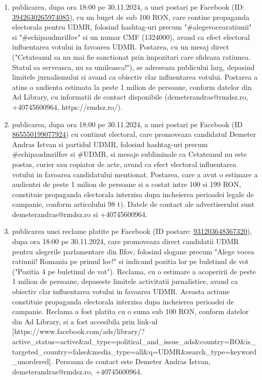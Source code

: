\documentclass[a4paper,12pt]{article}
\begin{document}
\begin{enumerate}[leftmargin=*, label=\arabic*.)]
    \item publicarea, dupa ora 18:00 pe 30.11.2024, a unei postari pe Facebook (ID: \href{https://www.facebook.com/ads/library/?id=3942630265974085}{3942630265974085}), cu un buget de sub 100 RON, care contine propaganda electorala pentru UDMR,  folosind hashtag-uri precum "\#alegevocearatiunii" si "\#echipaudmrilfov" si un numar CMF (1324000),  avand ca efect electoral influentarea votului in favoarea UDMR.  Postarea, cu un mesaj direct ("Cetateanul sa nu mai fie sanctionat prin impozitari care sfideaza ratiunea. Statul sa serveasca, nu sa umileasca!"),  se adreseaza publicului larg, depasind limitele jurnalismului si avand ca obiectiv clar influentarea votului.  Postarea a atins o audienta estimata la peste 1 milion de persoane, conform datelor din Ad Library, cu informatii de contact disponibile (demeterandras@rmdsz.ro, +40745600964, https://rmdsz.ro/).
    \item publicarea, dupa ora 18:00 pe 30.11.2024, a unei postari pe Facebook (ID \href{https://www.facebook.com/ads/library/?id=865550199077924}{865550199077924}) cu continut electoral,  care promoveaza candidatul Demeter Andras Istvan si partidul UDMR, folosind hashtag-uri precum \#echipaudmrilfov si \#UDMR,  si mesaje subliminale ca Cetateanul nu este postas, curier sau copiator de acte,  avand ca efect electoral influentarea votului in favoarea candidatului mentionat. Postarea, care a avut o estimare a audientei de peste 1 milion de persoane si a costat intre 100 si 199 RON,  constituie propaganda electorala interzisa dupa incheierea perioadei legale de campanie, conform articolului 98 t).  Datele de contact ale advertiserului sunt demeterandras@rmdsz.ro si +40745600964.
    \item publicarea unei reclame platite pe Facebook (ID postare: \href{https://www.facebook.com/ads/library/?id=931203648367320}{931203648367320}), dupa ora 18:00 pe 30.11.2024, care promoveaza direct candidatii UDMR pentru alegerile parlamentare din Ilfov, folosind slogane precum "Alege vocea ratiunii! Romania pe primul loc!" si indicand pozitia lor pe buletinul de vot ("Pozitia 4 pe buletinul de vot").  Reclama, cu o estimare a acoperirii de peste 1 milion de persoane, depaseste limitele activitatii jurnalistice, avand ca obiectiv clar influentarea votului in favoarea UDMR.  Aceasta actiune constituie propaganda electorala interzisa dupa incheierea perioadei de campanie.  Reclama a fost platita cu o suma sub 100 RON, conform datelor din Ad Library, si a fost accesibila prin link-ul [https://www.facebook.com/ads/library/?active\_status=active\&ad\_type=political\_and\_issue\_ads\&country=RO\&is\_targeted\_country=false\&media\_type=all\&q=UDMR\&search\_type=keyword\_unordered].  Persoana de contact este Demeter Andras Istvan, demeterandras@rmdsz.ro, +40745600964.
\end{enumerate}
\end{document}
